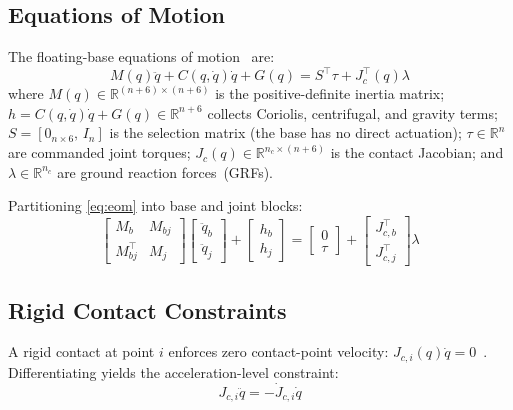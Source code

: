 \subsection{Equations of Motion}

The floating-base equations of motion~\cite{righetti2011inverse} are:
\begin{equation}\label{eq:eom}
  M(q)\ddot{q} + C(q,\dot{q})\dot{q} + G(q) = S^\top\tau + J_c^\top(q)\lambda
\end{equation}
where $M(q)\in\mathbb{R}^{(n+6)\times(n+6)}$ is the positive-definite
inertia matrix; $h=C(q,\dot{q})\dot{q}+G(q)\in\mathbb{R}^{n+6}$ collects
Coriolis, centrifugal, and gravity terms; $S=[0_{n\times6},\,I_n]$ is the
selection matrix (the base has no direct actuation); $\tau\in\mathbb{R}^n$
are commanded joint torques; $J_c(q)\in\mathbb{R}^{n_c\times(n+6)}$ is the
contact Jacobian; and $\lambda\in\mathbb{R}^{n_c}$ are ground reaction
forces~(GRFs).

Partitioning \eqref{eq:eom} into base and joint blocks:
\begin{equation}\label{eq:partition}
  \begin{bmatrix}M_b & M_{bj} \\ M_{bj}^\top & M_j\end{bmatrix}
  \begin{bmatrix}\ddot{q}_b \\ \ddot{q}_j\end{bmatrix}
  +\begin{bmatrix}h_b \\ h_j\end{bmatrix}
  =\begin{bmatrix}0 \\ \tau\end{bmatrix}
  +\begin{bmatrix}J_{c,b}^\top \\ J_{c,j}^\top\end{bmatrix}\lambda
\end{equation}

\subsection{Rigid Contact Constraints}

A rigid contact at point $i$ enforces zero contact-point
velocity: $J_{c,i}(q)\dot{q}=0$~\cite{righetti2011inverse}.
Differentiating yields the acceleration-level constraint:
\begin{equation}\label{eq:contact_acc}
  J_{c,i}\ddot{q} = -\dot{J}_{c,i}\dot{q}
\end{equation}

